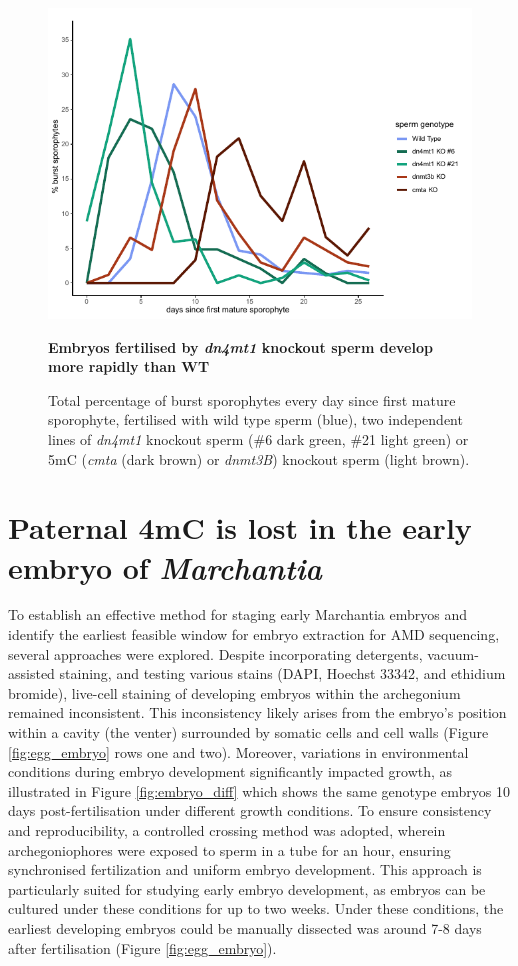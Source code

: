 \begin{figure}[htbp!] 
\centering    
    \includegraphics[width=1\textwidth]{Chapter3/Figs/Intro/burstpeak_nuclei_number.pdf}
\caption{\textbf{Embryos fertilised by \textit{dn4mt1} knockout sperm develop more rapidly than WT}}
\label{fig:burstpeak}
\captionsetup{font=small}
    \caption*{Total percentage of burst sporophytes every day since first mature sporophyte, fertilised with wild type sperm (blue), two independent lines of \textit{dn4mt1} knockout sperm (\#6 dark green, \#21 light green) or 5mC (\textit{cmta} (dark brown) or \textit{dnmt3B}) knockout sperm (light brown). }
\end{figure}

\clearpage

\section{Paternal 4mC is lost in the early embryo of \textit{Marchantia}}

To establish an effective method for staging early Marchantia embryos and identify the earliest feasible window for embryo extraction for AMD sequencing, several approaches were explored. Despite incorporating detergents, vacuum-assisted staining, and testing various stains (DAPI, Hoechst 33342, and ethidium bromide), live-cell staining of developing embryos within the archegonium remained inconsistent. This inconsistency likely arises from the embryo's position within a cavity (the venter) surrounded by somatic cells and cell walls (Figure \ref{fig:egg_embryo} rows one and two). Moreover, variations in environmental conditions during embryo development significantly impacted growth, as illustrated in Figure \ref{fig:embryo_diff} which shows the same genotype embryos 10 days post-fertilisation under different growth conditions. To ensure consistency and reproducibility, a controlled crossing method was adopted, wherein archegoniophores were exposed to sperm in a tube for an hour, ensuring synchronised fertilization and uniform embryo development. This approach is particularly suited for studying early embryo development, as embryos can be cultured under these conditions for up to two weeks\citep{RN139}. Under these conditions, the earliest developing embryos could be manually dissected was around 7-8 days after fertilisation (Figure \ref{fig:egg_embryo}).

